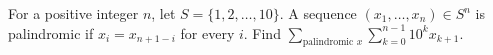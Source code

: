 For a positive integer $n$, let $S=\{1,2,\ldots,10\}$. A sequence $(x_1,\ldots,x_n)\in S^n$ is palindromic if $x_i=x_{n+1-i}$ for every $i$. Find $\displaystyle\sum_{\text{palindromic }x}\sum_{k=0}^{n-1}10^kx_{k+1}$.
